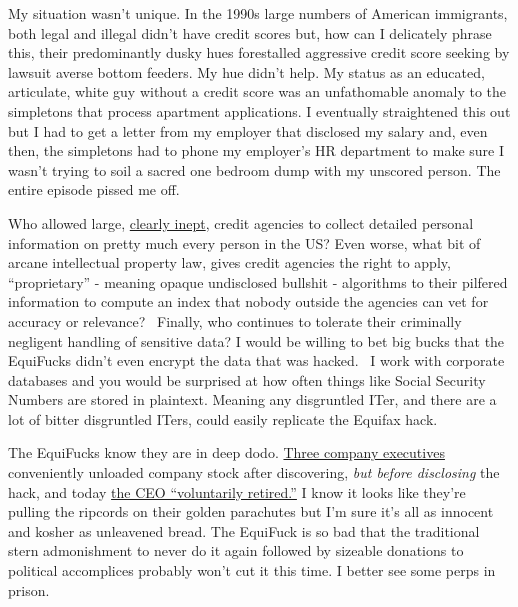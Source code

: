My situation wasn't unique. In the 1990s large numbers of American
immigrants, both legal and illegal didn't have credit scores but, how
can I delicately phrase this, their predominantly dusky hues forestalled
aggressive credit score seeking by lawsuit averse bottom feeders. My hue
didn't help. My status as an educated, articulate, white guy without a
credit score was an unfathomable anomaly to the simpletons that process
apartment applications. I eventually straightened this out but I had to
get a letter from my employer that disclosed my salary and, even then,
the simpletons had to phone my employer's HR department to make sure I
wasn't trying to soil a sacred one bedroom dump with my unscored person.
The entire episode pissed me off.

Who allowed large,
\href{http://www.marketwatch.com/story/equifax-ceo-hired-a-music-major-as-the-companys-chief-security-officer-2017-09-15?mod=mw_share_twitter}{clearly
inept}, credit agencies to collect detailed personal information on
pretty much every person in the US? Even worse, what bit of arcane
intellectual property law, gives credit agencies the right to apply,
``proprietary'' - meaning opaque undisclosed bullshit - algorithms to
their pilfered information to compute an index that nobody outside the
agencies can vet for accuracy or relevance?~ Finally, who continues to
tolerate their criminally negligent handling of sensitive data? I would
be willing to bet big bucks that the EquiFucks didn't even encrypt the
data that was hacked.~ I work with corporate databases and you would be
surprised at how often things like Social Security Numbers are stored in
plaintext. Meaning any disgruntled ITer, and there are a lot of bitter
disgruntled ITers, could easily replicate the Equifax hack.

The EquiFucks know they are in deep dodo.
\href{http://www.latimes.com/business/la-fi-equifax-insider-trading-20170908-story.html}{Three
company executives} conveniently unloaded company stock after
discovering, \emph{but before disclosing} the hack, and today
\href{http://abcnews.go.com/Technology/wireStory/equifax-ceo-retires-wake-damaging-data-breach-50102174}{the
CEO ``voluntarily retired.''} I know it looks like they're pulling the
ripcords on their golden parachutes but I'm sure it's all as innocent
and kosher as unleavened bread. The EquiFuck is so bad that the
traditional stern admonishment to never do it again followed by sizeable
donations to political accomplices probably won't cut it this time. I
better see some perps in prison.

